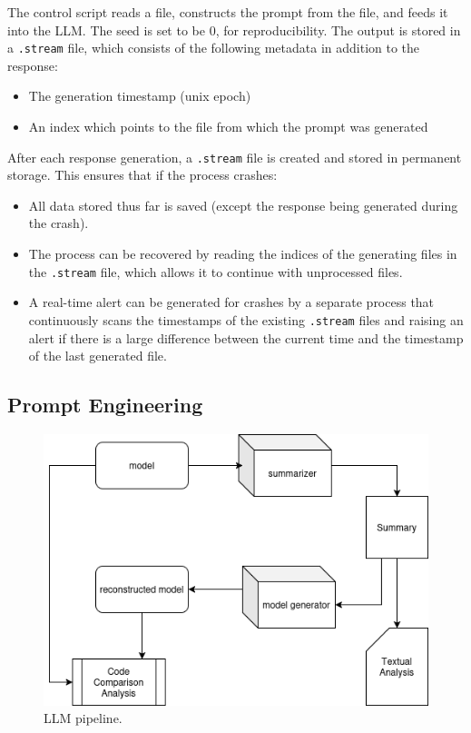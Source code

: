 \documentclass[conference]{IEEEtran}
\begin{document}
The control script reads a file, constructs the prompt from the file, and feeds it into the LLM. The seed is set to be 0, for reproducibility. The output is stored in a \verb|.stream| file, which consists of the following metadata in addition to the response:

\begin{itemize}
    \item The generation timestamp (unix epoch)
    \item An index which points to the file from which the prompt was generated
\end{itemize}

After each response generation, a \verb|.stream| file is created and stored in permanent storage. This ensures that if the process crashes:

\begin{itemize}
    \item All data stored thus far is saved (except the response being generated during the crash).
    \item The process can be recovered by reading the indices of the generating files in the \verb|.stream| file, which allows it to continue with unprocessed files.
    \item A real-time alert can be generated for crashes by a separate process that continuously scans the timestamps of the existing \verb|.stream| files and raising an alert if there is a large difference between the current time and the timestamp of the last generated file.
\end{itemize}

\subsection{Prompt Engineering}

\begin{figure}[htbp]
    \centerline{\includegraphics[width=\linewidth]{"./images/pipeline.png"}}
    \caption{LLM pipeline.}
    \label{fig}
    \end{figure}
\end{document}
